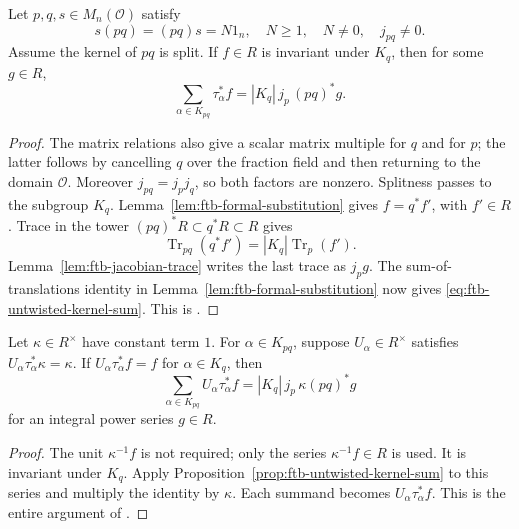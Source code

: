 \begin{srproposition}
\label{prop:ftb-untwisted-kernel-sum}
Let \(p,q,s\in M_n(\mathcal O)\) satisfy
\[
 s(pq)=(pq)s=N1_n,\quad N\ge1,\quad N\ne0,\quad j_{pq}\ne0 .
\]
Assume the kernel of \(pq\) is split.  If \(f\in R\) is invariant
under \(K_q\), then for some \(g\in R\),
\begin{equation}\label{eq:ftb-untwisted-kernel-sum}
 \sum_{\alpha\in K_{pq}}\tau_\alpha^*f
                         =|K_q|\,j_p\,(pq)^*g .
\end{equation}
\end{srproposition}
\begin{proof}
The matrix relations also give a scalar matrix multiple for \(q\)
and for \(p\); the latter follows by cancelling \(q\) over the
fraction field and then returning to the domain \(\mathcal O\).
Moreover \(j_{pq}=j_pj_q\), so both factors are nonzero.
Splitness passes to the subgroup \(K_q\).
Lemma~\ref{lem:ftb-formal-substitution} gives \(f=q^*f'\), with
\(f'\in R\).
Trace in the tower
\((pq)^*R\subset q^*R\subset R\) gives
\[
 \operatorname{Tr}_{pq}(q^*f')
                    =|K_q|\operatorname{Tr}_p(f').
\]
Lemma~\ref{lem:ftb-jacobian-trace} writes the last trace as \(j_pg\).
The sum-of-translations identity in
Lemma~\ref{lem:ftb-formal-substitution} now gives
\eqref{eq:ftb-untwisted-kernel-sum}.
This is .
\end{proof}

\begin{srlemma}
\label{lem:ftb-twisted-kernel-sum}
Let \(\kappa\in R^\times\) have constant term \(1\).
For \(\alpha\in K_{pq}\), suppose \(U_\alpha\in R^\times\) satisfies
\(U_\alpha\tau_\alpha^*\kappa=\kappa\).
If \(U_\alpha\tau_\alpha^*f=f\) for \(\alpha\in K_q\), then
\[
 \sum_{\alpha\in K_{pq}}U_\alpha\tau_\alpha^*f
                   =|K_q|\,j_p\,\kappa(pq)^*g
\]
for an integral power series \(g\in R\).
\end{srlemma}
\begin{proof}
The unit \(\kappa^{-1}f\) is not required; only the series
\(\kappa^{-1}f\in R\) is used.
It is invariant under \(K_q\).
Apply Proposition~\ref{prop:ftb-untwisted-kernel-sum} to this series
and multiply the identity by \(\kappa\).
Each summand becomes \(U_\alpha\tau_\alpha^*f\).
This is the entire argument of
.
\end{proof}

